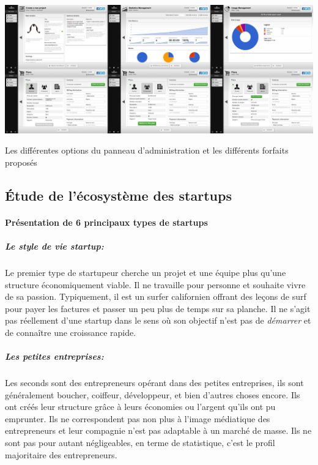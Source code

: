 \documentclass[11pt, a4paper ]{article}
\begin{document}
\begin{spacing}{1.5}
\begin{center}
	\includegraphics[width=\textwidth]{images/HBscreen/dash.png}
	\caption{Les différentes options du panneau d'administration et les différents forfaits proposés}
\end{center}


	\subsection{Étude de l'écosystème des startups}

		\paragraph{Présentation de 6 principaux\cite{typeStartup} types de startups}

			\subparagraph{Le style de vie startup:} %
Le premier type de startupeur cherche un projet et une équipe plus qu'une structure économiquement viable. Il ne travaille pour personne et souhaite vivre de sa passion. Typiquement, il est un surfer californien offrant des leçons de surf pour payer les factures et passer un peu plus de temps sur sa planche. Il ne s'agit pas réellement d'une startup dans le sens où son objectif n'est pas de \emph{démarrer} et de connaître une croissance rapide.

			\subparagraph{Les petites entreprises:} %
Les seconds sont des entrepreneurs opérant dans des petites entreprises, ils sont généralement boucher, coiffeur, développeur, et bien d'autres choses encore. Ils ont créés leur structure grâce à leurs économies ou l'argent qu'ils ont pu emprunter. Ils ne correspondent pas non plus à l'image médiatique des entrepreneurs et leur compagnie n'est pas adaptable à un marché de masse. Ils ne sont pas pour autant négligeables, en terme de statistique, c'est le profil majoritaire des entrepreneurs.


\end{spacing}
\end{document}
